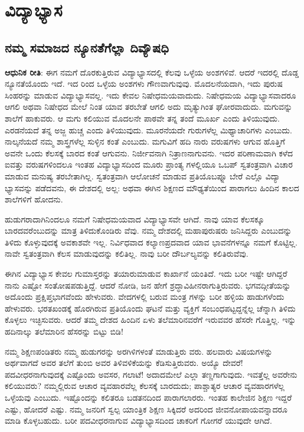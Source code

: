
\chapter{ವಿದ್ಯಾಭ್ಯಾಸ}

\section{ನಮ್ಮ ಸಮಾಜದ ನ್ಯೂನತೆಗೆಲ್ಲಾ ದಿವ್ಯೌಷಧಿ}

\textbf{ಆಧುನಿಕ ರೀತಿ}: ಈಗ ನಮಗೆ ದೊರಕುತ್ತಿರುವ ವಿದ್ಯಾಭ್ಯಾಸದಲ್ಲಿ ಕೆಲವು ಒಳ್ಳೆಯ ಅಂಶಗಳಿವೆ. ಆದರೆ ಇದರಲ್ಲಿ ದೊಡ್ಡ ನ್ಯೂನತೆಯೊಂದು ಇದೆ. ಇದ ರಿಂದ ಒಳ್ಳೆಯ ಅಂಶಗಳು ಗೌಣವಾಗುವುವು. ಮೊದಲನೆಯದಾಗಿ, ಇದು ಪುರುಷ ಸಿಂಹರನ್ನು ಮಾಡುವ ವಿದ್ಯಾಭ್ಯಾಸವಲ್ಲ. ಇದು ಕೇವಲ ನಿಷೇಧಮಯವಾದುದು. ನಿಷೇಧಮಯ ವಿದ್ಯಾಭ್ಯಾಸವಾದರೂ ಆಗಲಿ ಅಥವಾ ನಿಷೇಧದ ಮೇಲೆ ನಿಂತ ಯಾವ ತರಬೇತೆ ಆಗಲಿ ಅದು ಮೃತ್ಯುಗಿಂತ ಘೋರವಾದುದು. ಮಗುವನ್ನು ಶಾಲೆಗೆ ಹಾಕುವರು. ಆ ಮಗು ಕಲಿಯುವ ಮೊದಲನೇ ಪಾಠವೇ ತನ್ನ ತಂದೆ ಮೂರ್ಖ ಎಂದು ತಿಳಿಯುವುದು. ಎರಡನೆಯದೆ ತನ್ನ ಅಜ್ಜ ಹುಚ್ಚ ಎಂದು ತಿಳಿಯುವುದು. ಮೂರನೆಯದೇ ಗುರುಗಳೆಲ್ಲ ಮಿಥ್ಯಾಚಾರಿಗಳು ಎಂಬುದು. ನಾಲ್ಕನೆಯದೆ ನಮ್ಮ ಶಾಸ್ತ್ರಗಳೆಲ್ಲ ಸುಳ್ಳಿನ ಕಂತೆ ಎಂಬುದು. ಮಗುವಿಗೆ ಹದಿ ನಾರು ವರುಷಗಳು ಆಗುವ ಹೊತ್ತಿಗೆ ಅವನೇ ಒಂದು ಕೆಲಸಕ್ಕೆ ಬಾರದ ಕಂತೆ ಆಗುವನು. ನಿರ್ಜೀವನಾಗಿ ನಿತ್ರಾಣನಾಗುವನು. ಇದರ ಪರಿಣಾಮವಾಗಿ ಕಳೆದ ಐವತ್ತು ವರುಷಗಳಿಂದಲೂ ಇಂತಹ ವಿದ್ಯಾಭ್ಯಾಸದಿಂದ ಮೂರು ಪ್ರಾಂತ್ಯ ಗಳಲ್ಲಿಯೂ ಒಬಪ್ ಸ್ವತಂತ್ರವಾಗಿ ವಿಚಾರ ಮಾಡುವ ಮನುಷ್ಯ ತರಬೇತಾಗಿಲ್ಲ. ಸ್ವತಂತ್ರವಾಗಿ ಆಲೋಚನೆ ಮಾಡುವ ಪ್ರತಿಯೊಬಪ್ನೂ ಬೇರೆ ಎಲ್ಲೊ ವಿದ್ಯಾ ಭ್ಯಾಸವನ್ನು ಪಡೆದವನು, ಈ ದೇಶದಲ್ಲಿ ಅಲ್ಲ: ಅಥವಾ ಈಗಿನ ಶಿಕ್ಷಣದ ಮೌಢ್ಯತೆಯಿಂದ ಪಾರಾಗಲು ಹಿಂದಿನ ಕಾಲದ ಶಾಲೆಗಳಿಗೆ ಹೋದನು.

ಹುಡುಗರಾದಾಗಿನಿಂದಲೂ ನಮಗೆ ನಿಷೇಧಮಯವಾದ ವಿದ್ಯಾಭ್ಯಾಸವೇ ಆಗಿದೆ. ನಾವು ಯಾವ ಕೆಲಸಕ್ಕೂ ಬಾರದವರೆಂಬುದನ್ನು ಮಾತ್ರ ತಿಳಿದುಕೊಂಡಿರು ವೆವು. ನಮ್ಮ ದೇಶದಲ್ಲಿ ಮಹಾಪುರುಷರು ಜನಿಸಿದ್ದರು ಎಂಬುದನ್ನು ತಿಳಿದು ಕೊಳ್ಳುವುದಕ್ಕೆ ಅವಕಾಶವೇ ಇಲ್ಲ. ನಿರ್ವಿಧವಾದ ಕಲ್ಯಾಣಪ್ರದವಾದ ಯಾವ ಭಾವನೆಗಳನ್ನೂ ನಮಗೆ ಕೊಟ್ಟಿಲ್ಲ. ನಾವೇ ಸ್ವತಂತ್ರವಾಗಿ ಕೆಲಸ ಮಾಡುವುದನ್ನು ಕಲಿತಿಲ್ಲ. ನಾವು ಬರೀ ದೌರ್ಬಲ್ಯವನ್ನು ಕಲಿತಿರುವೆವು.

ಈಗಿನ ವಿದ್ಯಾಭ್ಯಾಸ ಕೇವಲ ಗುಮಾಸ್ತರನ್ನು ತಯಾರುಮಾಡುವ ಕಾರ್ಖಾನೆ ಯಂತಿದೆ. ಇದು ಬರೀ ಇಷ್ಟೇ ಆಗಿದ್ದರೆ ನಾನು ಎಷ್ಟೋ ಸಂತೋಷಪಡುತ್ತಿದ್ದೆ. ಆದರೆ ನೋಡಿ, ಜನ ಹೇಗೆ ಶ್ರದ್ಧಾವಿಹೀನರಾಗುತ್ತಿರುವರು. ಭಗವದ್ಗೀತೆಯನ್ನು ಅದೊಂದು ಪ್ರಕ್ಷಿಪ್ತಭಾಗವೆಂದು ಹೇಳುವರು. ವೇದಗಳಲ್ಲಿ ಬರುವ ಮಂತ್ರ ಗಳನ್ನು ಬರೀ ಹಳ್ಳಿಯ ಹಾಡುಗಳೆಂದು ಹೇಳುವರು. ಭರತಖಂಡಕ್ಕೆ ಹೊರಗಿರುವ ಪ್ರತಿಯೊಂದು ಘಟನೆ ಮತ್ತು ವ್ಯಕ್ತಿಗೆ ಸಂಬಂಧಪಟ್ಟದ್ದನ್ನೆಲ್ಲ ಚೆನ್ನಾಗಿ ತಿಳಿದು ಕೊಳ್ಳಲು ಇಚ್ಛಿಸುವರು. ಆದರೆ ತಮ್ಮ ದೇಶದ ಹಿಂದಿನ ಏಳು ತಲೆಮಾರಿನವರೆಗೆ ಇರುವವರ ಹೆಸರೇ ಗೊತ್ತಿಲ್ಲ. ಇನ್ನು ಹದಿನಾಲ್ಕು ತಲೆಮಾರಿನ ಹೆಸರನ್ನು ಬಿಟ್ಟು ಬಿಡಿ!

ನಮ್ಮ ಶಿಕ್ಷಣಪಂಡಿತರು ನಮ್ಮ ಹುಡುಗರನ್ನು ಅರಗಿಳಿಗಳಂತೆ ಮಾಡುತ್ತಿರು ವರು. ಹಲವಾರು ವಿಷಯಗಳನ್ನು ಅರ್ಥವಾಗದೆ ಅವರ ತಲೆಗೆ ತುಂಬಿ ಅವರ ತಿಳಿವಳಿಕೆಯನ್ನು ಕೆಡಿಸುತ್ತಿರುವರು. ಅಯ್ಯೊ ದೇವರೆ! ಪದವೀಧರನಾಗುವುದಕ್ಕೆ ಎಷ್ಟೊಂದು ಅವಸರ, ಗಲಾಟೆ! ಅದಾದಮೇಲೆ ಎಲ್ಲಾ ತಣ್ಣಗಾಗುವುದು. ಇವತ್ತೆಲ್ಲ ಅವರೇನು ಕಲಿಯುವರು? ನಮ್ಮಲ್ಲಿರುವ ಆಚಾರ ವ್ಯವಹಾರವೆಲ್ಲ ಕೆಲಸಕ್ಕೆ ಬಾರದುದು; ಪಾಶ್ಚಾತ್ಯರ ಆಚಾರ ವ್ಯವಹಾರಗಳೆಲ್ಲ ಒಳ್ಳೆಯವು ಎಂಬುದು. ಇಷ್ಟೊಂದನ್ನು ಕಲಿತರೂ ಬಡತನದಿಂದ ಪಾರಾಗಲಾರರು. ಇಂತಹ ಕಾಲೇಜಿನ ಶಿಕ್ಷಣ ಇದ್ದರೆ ಎಷ್ಟು, ಹೋದರೆ ಎಷ್ಟು. ನಮ್ಮ ಜನರಿಗೆ ಸ್ವಲ್ಪ ಯಾಂತ್ರಿಕ ಶಿಕ್ಷಣ ಸಿಕ್ಕಿದರೆ ಅದರಿಂದ ಜೀವನೋಪಾಯವನ್ನಾದರೂ ಮಾಡಿ ಕೊಳ್ಳಬಹುದು. ಬರೀ ಪದವೀಧರನಾಗುವ ವಿದ್ಯಾಭ್ಯಾಸದಿಂದ ಚಾಕರಿಗೆ ಗೋಗರೆ ಯುವುದೇ ಆಗಿದೆ.


